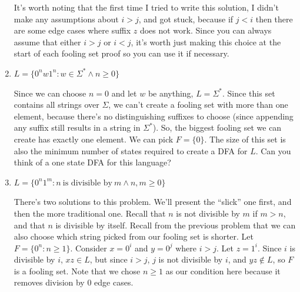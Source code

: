 \documentclass[fleqn]{article}
\begin{document}
\begin{enumerate}
\begin{answer}
        It's worth noting that the first time I tried to write this solution, I didn't make any assumptions about $i > j$, and got stuck, because if $j < i$ then there are some edge cases where suffix $z$ does not work. Since you can always assume that either $i > j$ or $i < j$, it's worth just making this choice at the start of each fooling set proof so you can use it if necessary.
    \end{answer}
    \item $L = \{0^n w 1^n : w \in \Sigma^* \wedge n \geq 0\}$
    \begin{answer}
        Since we can choose $n = 0$ and let $w$ be anything, $L = \Sigma^*$. Since this set contains all strings over $\Sigma$, we can't create a fooling set with more than one element, because there's no distinguishing suffixes to choose (since appending any suffix still results in a string in $\Sigma^*$). So, the biggest fooling set we can create has exactly one element. We can pick $\boxed{F = \{0\}}$. The size of this set is also the minimum number of states required to create a DFA for $L$. Can you think of a one state DFA for this language?
    \end{answer}
    \item $L = \{0^n 1^m : n~\text{is divisible by}~m \wedge n,m \geq 0\}$
    \begin{answer}
        There's two solutions to this problem. We'll present the ``slick'' one first, and then the more traditional one. Recall that $n$ is not divisible by $m$ if $m > n$, and that $n$ is divisible by itself. Recall from the previous problem that we can also choose which string picked from our fooling set is shorter. Let $\boxed{F = \{0^n : n \geq 1\}}$. Consider $x = 0^i$ and $y = 0^j$ where $i > j$. Let $z = 1^i$. Since $i$ is divisible by $i$, $xz \in L$, but since $i > j$, $j$ is not divisible by $i$, and $yz \notin L$, so $F$ is a fooling set. Note that we chose $n \geq 1$ as our condition here because it removes division by $0$ edge cases.


\end{answer}
\end{enumerate}
\end{document}
